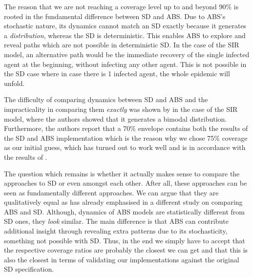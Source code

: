 \medskip

The reason that we are not reaching a coverage level up to and beyond 90\% is rooted in the fundamental difference between SD and ABS. Due to ABS's stochastic nature, its dynamics cannot match an SD exactly because it generates a \textit{distribution}, whereas the SD is deterministic. This enables ABS to explore and reveal paths which are not possible in deterministic SD. In the case of the SIR model, an alternative path would be the immediate recovery of the single infected agent at the beginning, without infecting any other agent. This is not possible in the SD case where in case there is 1 infected agent, the whole epidemic will unfold.

The difficulty of comparing dynamics between SD and ABS and the impracticality in comparing them \textit{exactly} was shown by \cite{macal_agent-based_2010} in the case of the SIR model, where the authors showed that it generates a bimodal distribution. Furthermore, the authors report that a 70\% envelope contains both the results of the SD and ABS implementation which is the reason why we chose 75\% coverage as our initial guess, which has turned out to work well and is in accordance with the results of \cite{macal_agent-based_2010}. %

\medskip

The question which remains is whether it actually  makes sense to compare the approaches to SD or even amongst each other. After all, these approaches can be seen as fundamentally different approaches. We can argue that they are qualitatively equal as \cite{figueredo_comparing_2014} has already emphasised in a different study on comparing ABS and SD. Although, dynamics of ABS models are statistically different from SD ones, they \textit{look} similar. The main difference is that ABS can contribute additional insight through revealing extra patterns due to its stochasticity, something not possible with SD. Thus, in the end we simply have to accept that the respective coverage ratios are probably the closest we can get and that this is also the closest in terms of validating our implementations against the original SD specification.

